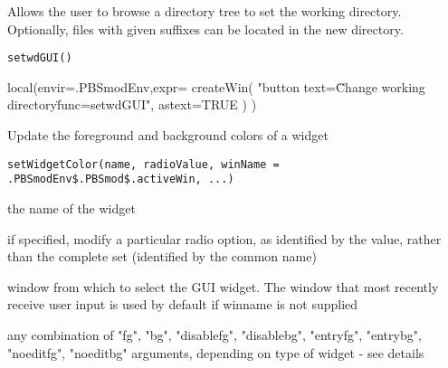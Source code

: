 \documentclass[letterpaper]{book}
\begin{document}
%
\begin{Description}\relax
Allows the user to browse a directory tree to set the working directory.
Optionally, files with given suffixes can be located in the new directory.
\end{Description}
%
\begin{Usage}
\begin{verbatim}
setwdGUI()
\end{verbatim}
\end{Usage}
%
\begin{Examples}
\begin{ExampleCode}
local(envir=.PBSmodEnv,expr={
  createWin( "button text=\"Change working directory\" func=setwdGUI", astext=TRUE )
})
\end{ExampleCode}
\end{Examples}
%
\begin{Description}\relax
Update the foreground and background colors of a widget
\end{Description}
%
\begin{Usage}
\begin{verbatim}
setWidgetColor(name, radioValue, winName = .PBSmodEnv$.PBSmod$.activeWin, ...)
\end{verbatim}
\end{Usage}
%
\begin{Arguments}
\begin{ldescription}
\item[\code{name}] the name of the widget
\item[\code{radioValue}] if specified, modify a particular radio option, as identified by the value, rather than the complete set (identified by the common name)
\item[\code{winName}] window from which to select the GUI widget. 
The window that most recently receive user input is used by default if winname is not supplied
\item[\code{...}]  any combination of "fg", "bg", "disablefg", "disablebg", "entryfg", "entrybg", "noeditfg", "noeditbg" arguments, depending on type of widget - see details
\end{ldescription}
\end{Arguments}
%
\end{document}
